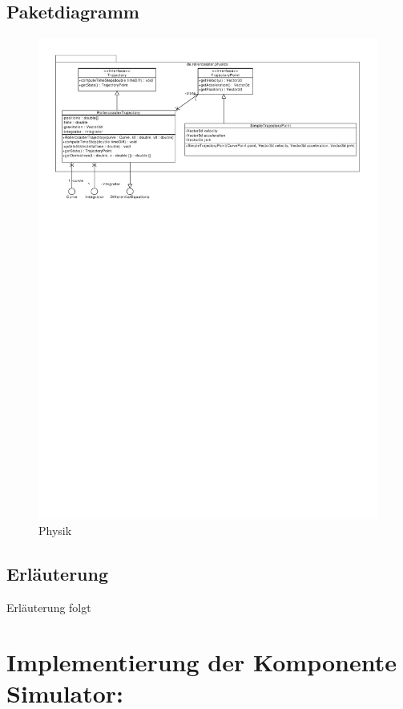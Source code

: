 \subsection{Paketdiagramm}
\begin{figure}
\includegraphics[width=\linewidth]{bilder/Physics}
\caption{Physik}
\end{figure}

\subsection{Erläuterung}

Erläuterung folgt


\section{Implementierung der Komponente Simulator:}

